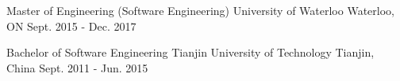 \vspace{-0.8em}
\begin{cventries}
  \cventry
    {Master of Engineering (Software Engineering)}
    {University of Waterloo}
    {Waterloo, ON}
    {Sept. 2015 - Dec. 2017}
    {
      \begin{cvitems}
      \end{cvitems}
    }
    \cventry
    {Bachelor of Software Engineering}
    {Tianjin University of Technology}
    {Tianjin, China}
    {Sept. 2011 - Jun. 2015}
    {
      \begin{cvitems}
      \end{cvitems}
    }
\end{cventries}
